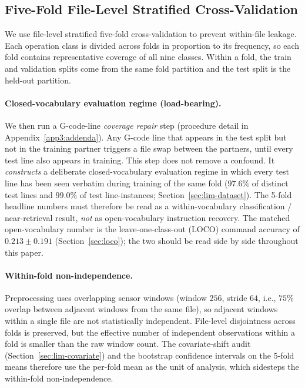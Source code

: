 \documentclass[sensors,article,submit,moreauthors,pdftex]{Definitions/mdpi}
\begin{document}
\subsection{Five-Fold File-Level Stratified Cross-Validation}
\label{sec:cv}

We use file-level stratified five-fold cross-validation to prevent within-file leakage. Each operation class is divided across folds in proportion to its frequency, so each fold contains representative coverage of all nine classes. Within a fold, the train and validation splits come from the same fold partition and the test split is the held-out partition.

\paragraph{Closed-vocabulary evaluation regime (load-bearing).} We then run a G-code-line \emph{coverage repair} step (procedure detail in Appendix~\ref{app3:addenda}). Any G-code line that appears in the test split but not in the training partner triggers a file swap between the partners, until every test line also appears in training. This step does not remove a confound. It \emph{constructs} a deliberate closed-vocabulary evaluation regime in which every test line has been seen verbatim during training of the same fold ($97.6\%$ of distinct test lines and $99.0\%$ of test line-instances; Section~\ref{sec:lim-dataset}). The 5-fold headline numbers must therefore be read as a within-vocabulary classification / near-retrieval result, \emph{not} as open-vocabulary instruction recovery. The matched open-vocabulary number is the leave-one-class-out (LOCO) command accuracy of $0.213 \pm 0.191$ (Section~\ref{sec:loco}); the two should be read side by side throughout this paper.

\paragraph{Within-fold non-independence.} Preprocessing uses overlapping sensor windows (window $256$, stride $64$, i.e., $75\%$ overlap between adjacent windows from the same file), so adjacent windows within a single file are not statistically independent. File-level disjointness across folds is preserved, but the effective number of independent observations within a fold is smaller than the raw window count. The covariate-shift audit (Section~\ref{sec:lim-covariate}) and the bootstrap confidence intervals on the 5-fold means therefore use the per-fold mean as the unit of analysis, which sidesteps the within-fold non-independence.
\end{document}
